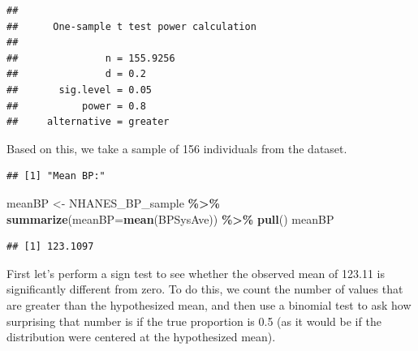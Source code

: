 \documentclass[
  12pt,
]{book}
\newenvironment{Shaded}{\begin{snugshade}}{\end{snugshade}}
\newcommand{\AttributeTok}[1]{\textcolor[rgb]{0.13,0.29,0.53}{#1}}
\newcommand{\FunctionTok}[1]{\textcolor[rgb]{0.13,0.29,0.53}{\textbf{#1}}}
\newcommand{\NormalTok}[1]{#1}
\newcommand{\OtherTok}[1]{\textcolor[rgb]{0.56,0.35,0.01}{#1}}
\newcommand{\SpecialCharTok}[1]{\textcolor[rgb]{0.81,0.36,0.00}{\textbf{#1}}}
\newcommand{\StringTok}[1]{\textcolor[rgb]{0.31,0.60,0.02}{#1}}
\begin{document}
\begin{verbatim}
## 
##      One-sample t test power calculation 
## 
##               n = 155.9256
##               d = 0.2
##       sig.level = 0.05
##           power = 0.8
##     alternative = greater
\end{verbatim}

Based on this, we take a sample of 156 individuals from the dataset.

\begin{Shaded}
\end{Shaded}

\begin{verbatim}
## [1] "Mean BP:"
\end{verbatim}

\begin{Shaded}
\begin{Highlighting}[]
\NormalTok{meanBP }\OtherTok{\textless{}{-}}\NormalTok{ NHANES\_BP\_sample }\SpecialCharTok{\%\textgreater{}\%}
  \FunctionTok{summarize}\NormalTok{(}\AttributeTok{meanBP=}\FunctionTok{mean}\NormalTok{(BPSysAve)) }\SpecialCharTok{\%\textgreater{}\%}
  \FunctionTok{pull}\NormalTok{()}
\NormalTok{meanBP}
\end{Highlighting}
\end{Shaded}

\begin{verbatim}
## [1] 123.1097
\end{verbatim}

First let's perform a sign test to see whether the observed mean of 123.11 is significantly different from zero. To do this, we count the number of values that are greater than the hypothesized mean, and then use a binomial test to ask how surprising that number is if the true proportion is 0.5 (as it would be if the distribution were centered at the hypothesized mean).
\end{document}
